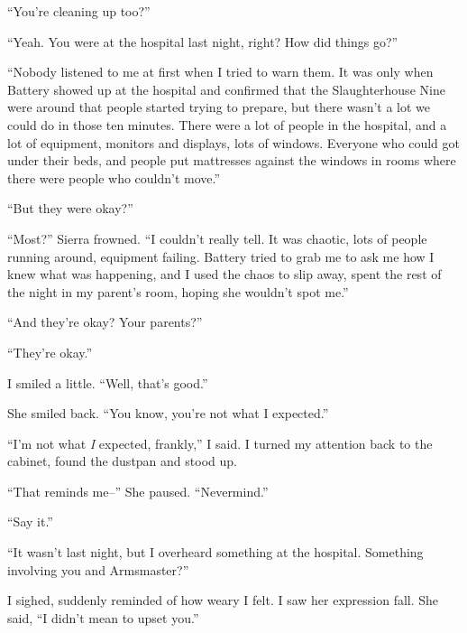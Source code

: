``You're cleaning up too?''



``Yeah.  You were at the hospital last night, right?  How did things go?''



``Nobody listened to me at first when I tried to warn them.  It was only when Battery showed up at the hospital and confirmed that the Slaughterhouse Nine were around that people started trying to prepare, but there wasn't a lot we could do in those ten minutes.  There were a lot of people in the hospital, and a lot of equipment, monitors and displays, lots of windows.  Everyone who could got under their beds, and people put mattresses against the windows in rooms where there were people who couldn't move.''



``But they were okay?''



``Most?'' Sierra frowned. ``I couldn't really tell.  It was chaotic, lots of people running around, equipment failing.  Battery tried to grab me to ask me how I knew what was happening, and I used the chaos to slip away, spent the rest of the night in my parent's room, hoping she wouldn't spot me.''



``And they're okay?  Your parents?''



``They're okay.''



I smiled a little.  ``Well, that's good.''



She smiled back.  ``You know, you're not what I expected.''



``I'm not what \emph{I }expected, frankly,'' I said.  I turned my attention back to the cabinet, found the dustpan and stood up.



``That reminds me--''  She paused.  ``Nevermind.''



``Say it.''



``It wasn't last night, but I overheard something at the hospital.  Something involving you and Armsmaster?''



I sighed, suddenly reminded of how weary I felt.  I saw her expression fall.  She said, ``I didn't mean to upset you.''



